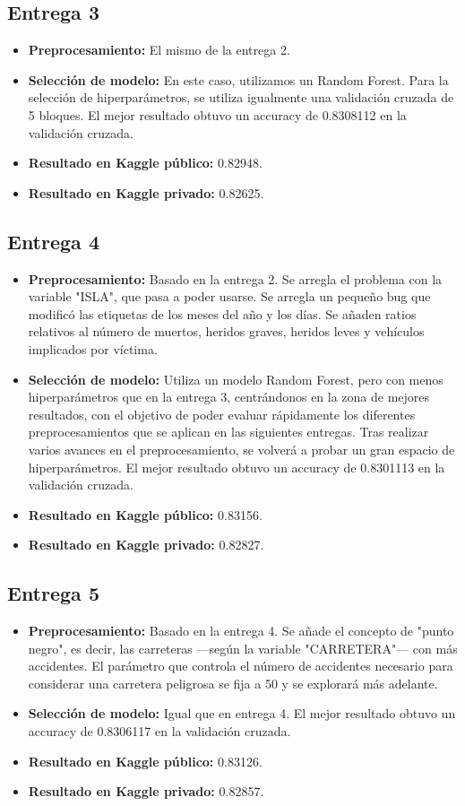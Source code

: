 \subsection{Entrega 3}
\begin{itemize}
\item \textbf{Preprocesamiento:} El mismo de la entrega 2.
\item \textbf{Selección de modelo:} En este caso, utilizamos un Random Forest. Para la selección de hiperparámetros, se utiliza igualmente una validación cruzada de 5 bloques. El mejor resultado obtuvo un accuracy de 0.8308112 en la validación cruzada.
\item \textbf{Resultado en Kaggle público:} 0.82948.
\item \textbf{Resultado en Kaggle privado:} 0.82625.
\end{itemize}

\subsection{Entrega 4}
\begin{itemize}
\item \textbf{Preprocesamiento:} Basado en la entrega 2. Se arregla el problema con la variable "ISLA", que pasa a poder usarse. Se arregla un pequeño bug que modificó las etiquetas de los meses del año y los días. Se añaden ratios relativos al número de muertos, heridos graves, heridos leves y vehículos implicados por víctima.
\item \textbf{Selección de modelo:} Utiliza un modelo Random Forest, pero con menos hiperparámetros que en la entrega 3, centrándonos en la zona de mejores resultados, con el objetivo de poder evaluar rápidamente los diferentes preprocesamientos que se aplican en las siguientes entregas. Tras realizar varios avances en el preprocesamiento, se volverá a probar un gran espacio de hiperparámetros. El mejor resultado obtuvo un accuracy de 0.8301113 en la validación cruzada.
\item \textbf{Resultado en Kaggle público:} 0.83156.
\item \textbf{Resultado en Kaggle privado:} 0.82827.
\end{itemize}

\subsection{Entrega 5}
\begin{itemize}
\item \textbf{Preprocesamiento:} Basado en la entrega 4. Se añade el concepto de "punto negro", es decir, las carreteras ---según la variable "CARRETERA"--- con más accidentes. El parámetro que controla el número de accidentes necesario para considerar una carretera peligrosa se fija a 50 y se explorará más adelante.
\item \textbf{Selección de modelo:} Igual que en entrega 4. El mejor resultado obtuvo un accuracy de 0.8306117 en la validación cruzada.
\item \textbf{Resultado en Kaggle público:} 0.83126.
\item \textbf{Resultado en Kaggle privado:} 0.82857.
\end{itemize}

